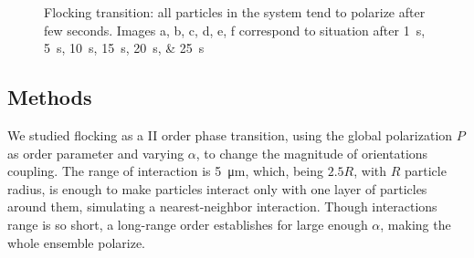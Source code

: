 \documentclass[../../master_thesis_np.tex]{subfiles}
\begin{document}
		\begin{figure}[htp]\ContinuedFloat
			\centering
			
			\caption{Flocking transition: all particles in the system tend to polarize after few seconds. Images a, b, c, d, e, f correspond to situation after \qtylist{1;5;10;15;20;25}{\second}}
			\label{fig:flock40}
		\end{figure}
		
		\subsection{Methods}	
		We studied flocking as a II order phase transition, using the global polarization $P$ as order parameter and varying $\alpha$, to change the magnitude of orientations coupling. 
		The range of interaction is \SI{5}{\micro\meter}, which, being $2.5R$, with $R$ particle radius, is enough to make particles interact only with one layer of particles around them, simulating a nearest-neighbor interaction. 
		Though interactions range is so short, a long-range order establishes for large enough $\alpha$, making the whole ensemble polarize.
		
\end{document}
